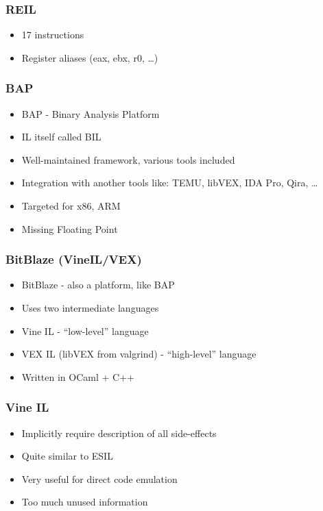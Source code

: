 \documentclass[10pt,pdf,utf8,english,compress,hyperref={unicode}]{beamer}
\begin{document}
\begin{frame}[fragile]
  \frametitle{REIL}
  \begin{itemize}
  \item 17 instructions
  \item Register aliases (eax, ebx, r0, \ldots) 
  \end{itemize}
\end{frame}

\begin{frame}[fragile]
  \frametitle{BAP}
  \begin{itemize}
  \item BAP - Binary Analysis Platform 
  \item IL itself called BIL
  \item Well-maintained framework, various tools included
  \item Integration with another tools like: TEMU, libVEX, IDA Pro, Qira, \ldots
  \item Targeted for x86, ARM
  \item Missing Floating Point
  \end{itemize}
\end{frame}

%

\begin{frame}[fragile]
  \frametitle{BitBlaze (VineIL/VEX)}
  \begin{itemize}
  \item BitBlaze  - also a platform, like BAP
  \item Uses two intermediate languages
  \item Vine IL - ``low-level'' language
  \item VEX IL (libVEX from valgrind) - ``high-level'' language
  \item Written in OCaml + C++
  \end{itemize}
\end{frame}

\begin{frame}[fragile]
  \frametitle{Vine IL  }
  \begin{itemize}
  \item Implicitly require description of all side-effects
  \item Quite similar to ESIL
  \item Very useful for direct code emulation
  \item Too much unused information
  \end{itemize}
\end{frame}
\end{document}
